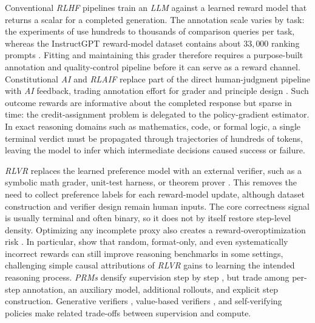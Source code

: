 \documentclass[a4paper,oneside,10pt,english]{scrbook}
\DeclareRobustCommand{\acfit}[1]{\textit{\ac{#1}}}
\DeclareRobustCommand{\acfpit}[1]{\textit{\acp{#1}}}
\begin{document}
Conventional \acfit{RLHF} pipelines train an \acfit{LLM} against a learned reward model that returns a scalar for a completed generation. The annotation scale varies by task: the experiments of \citet{drlhumanpreferences} use hundreds to thousands of comparison queries per task, whereas the InstructGPT reward-model dataset contains about $33{,}000$ ranking prompts \citep{rlhf}. Fitting and maintaining this grader therefore requires a purpose-built annotation and quality-control pipeline before it can serve as a reward channel. Constitutional \acfit{AI} and \acfit{RLAIF} replace part of the direct human-judgment pipeline with \acfit{AI} feedback, trading annotation effort for grader and principle design \citep{constitutionalai,rlaifvsrlhf}. Such outcome rewards are informative about the completed response but sparse in time: the credit-assignment problem is delegated to the policy-gradient estimator. In exact reasoning domains such as mathematics, code, or formal logic, a single terminal verdict must be propagated through trajectories of hundreds of tokens, leaving the model to infer which intermediate decisions caused success or failure.

\acfit{RLVR} replaces the learned preference model with an external verifier, such as a symbolic math grader, unit-test harness, or theorem prover \citep{deepseekmath,r1,r1zerocriticalperspective}. This removes the need to collect preference labels for each reward-model update, although dataset construction and verifier design remain human inputs. The core correctness signal is usually terminal and often binary, so it does not by itself restore step-level density. Optimizing any incomplete proxy also creates a reward-overoptimization risk \citep{rewardoveropt}. In particular, \citet{spuriousrewards} show that random, format-only, and even systematically incorrect rewards can still improve reasoning benchmarks in some settings, challenging simple causal attributions of \acfit{RLVR} gains to learning the intended reasoning process. \acfpit{PRM} densify supervision step by step \citep{verifystepbystep,processoutcomefeedback,mathshepherd,prmthatthink,freeprocessrewards}, but trade among per-step annotation, an auxiliary model, additional rollouts, and explicit step construction. Generative verifiers \citep{genverifiers}, value-based verifiers \citep{ovm,scalingverifiers}, and self-verifying policies \citep{trustbutverify} make related trade-offs between supervision and compute.
\end{document}
